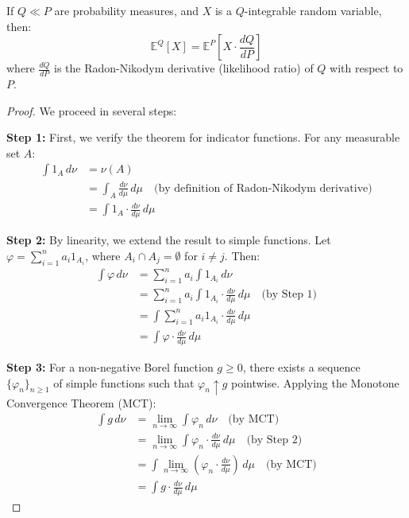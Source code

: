     \begin{remark}{}
    If $Q \ll P$ are probability measures, and $X$ is a $Q$-integrable random variable, then:
    \[
    \mathbb{E}^Q[X] = \mathbb{E}^P\left[X \cdot \frac{dQ}{dP}\right]
    \]
    where $\frac{dQ}{dP}$ is the Radon-Nikodym derivative (likelihood ratio) of $Q$ with respect to $P$.
    \end{remark}
    
    \begin{proof}
    We proceed in several steps:
    
    \textbf{Step 1:} First, we verify the theorem for indicator functions. For any measurable set $A$:
    \begin{align*}
    \int 1_A \, d\nu &= \nu(A)\\
    &= \int_A \frac{d\nu}{d\mu} \, d\mu \quad \text{(by definition of Radon-Nikodym derivative)}\\
    &= \int 1_A \cdot \frac{d\nu}{d\mu} \, d\mu
    \end{align*}
    
    \textbf{Step 2:} By linearity, we extend the result to simple functions. Let $\varphi = \sum_{i=1}^n a_i 1_{A_i}$, where $A_i \cap A_j = \emptyset$ for $i \neq j$. Then:
    \begin{align*}
    \int \varphi \, d\nu &= \sum_{i=1}^n a_i \int 1_{A_i} \, d\nu\\
    &= \sum_{i=1}^n a_i \int 1_{A_i} \cdot \frac{d\nu}{d\mu} \, d\mu \quad \text{(by Step 1)}\\
    &= \int \sum_{i=1}^n a_i 1_{A_i} \cdot \frac{d\nu}{d\mu} \, d\mu\\
    &= \int \varphi \cdot \frac{d\nu}{d\mu} \, d\mu
    \end{align*}
    
    \textbf{Step 3:} For a non-negative Borel function $g \geq 0$, there exists a sequence $\{\varphi_n\}_{n \geq 1}$ of simple functions such that $\varphi_n \uparrow g$ pointwise. Applying the Monotone Convergence Theorem (MCT):
    \begin{align*}
    \int g \, d\nu &= \lim_{n \to \infty} \int \varphi_n \, d\nu \quad \text{(by MCT)}\\
    &= \lim_{n \to \infty} \int \varphi_n \cdot \frac{d\nu}{d\mu} \, d\mu \quad \text{(by Step 2)}\\
    &= \int \lim_{n \to \infty} \left(\varphi_n \cdot \frac{d\nu}{d\mu}\right) \, d\mu \quad \text{(by MCT)}\\
    &= \int g \cdot \frac{d\nu}{d\mu} \, d\mu
    \end{align*}
    

\end{proof}
